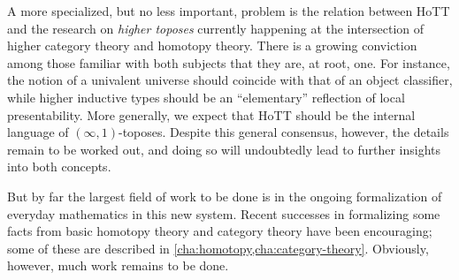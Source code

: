 {A more specialized, but no less important, problem is the relation between HoTT and the research  on \emph{higher toposes} currently happening at the intersection of higher category theory and homotopy theory.
There is a growing conviction among those familiar with both subjects that they are, at root, one.
For instance, the notion of a univalent universe should coincide with that of an object classifier, while higher inductive types should be an ``elementary'' reflection of local presentability.
More generally, we expect that HoTT should be the internal language of $(\infty,1)$-toposes.
Despite this general consensus, however, the details remain to be worked out, and doing so will undoubtedly lead to further insights into both concepts.

But by far the largest field of work to be done is in the ongoing formalization of everyday mathematics in this new system.
Recent successes in formalizing some facts from basic homotopy theory and category theory have been encouraging; some of these are described in \cref{cha:homotopy,cha:category-theory}.
Obviously, however, much work remains to be done.

%

}%


